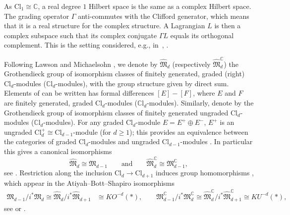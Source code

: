 \documentclass[pdftex]{sigma}
\numberwithin{equation}{section}
\newcommand{\C}{\mathbb{C}}
\newcommand{\Cl}{\mathrm{Cl}}
\newcommand{\CCl}{\mathbb{C}\mathrm{l}}
\begin{document}
\begin{Example}
As $\Cl_1 \cong \C$, a real degree $1$ Hilbert space is the same as a complex Hilbert space.
The grading operator $\Gamma$ anti-commutes with the Clifford generator, which means that it is a real structure for the complex structure.
A Lagrangian $L$ is then a complex subspace such that its complex conjugate $\Gamma L$ equals its orthogonal complement.
This is the setting considered, e.g., in~\cite[Section~2.2]{StolzTeichnerElliptic}, \cite{LudewigRoos}.
\end{Example}

Following Lawson and Michaelsohn \cite{LawsonMichelsohn}, we denote by $\hat{\mathfrak{M}}_d$ (respectively $\hat{\mathfrak{M}}_d^\C$) the Grothendieck group of isomorphism classes of finitely generated, graded (right) $\Cl_d$-modules ($\CCl_d$-modules), with the group structure given by direct sum.
Elements of \smash{$\hat{\mathfrak{M}}_d^{(\C)}$} can be written has formal differences $[E] - [F]$, where $E$ and $F$ are finitely generated, graded $\Cl_d$-modules ($\CCl_d$-modules).
Similarly, denote by \smash{$\mathfrak{M}_d^{(\C)}$} the Grothendieck group of isomorphism classes of finitely generated ungraded $\Cl_d$-modules ($\CCl_d$-modules).
For any graded $\Cl_d$-module $E = E^+ \oplus E^-$, $E^+$ is an ungraded $\Cl_d^+ \cong \Cl_{d-1}$-module (for $d \geq 1$); this provides an equivalence between the categories of graded $\Cl_d$-modules and ungraded $\Cl_{d-1}$-modules \cite[Proposition~5.20]{LawsonMichelsohn}.
In particular this gives a canonical isomorphisms
\begin{equation*} %
 \hat{\mathfrak{M}}_d \cong \mathfrak{M}_{d-1}\qquad \text{and} \qquad \hat{\mathfrak{M}}^\C_d \cong \mathfrak{M}^\C_{d-1},
\end{equation*}
see \cite[Proposition~5.1]{AtiyahBottShapiro}.
Restriction along the inclusion $\Cl_d \to \Cl_{d+1}$ induces group homo\-morphisms \smash{$i^*\colon \mathfrak{M}_{d+1}^{(\C)} \to \mathfrak{M}_d^{(\C)}$}, which appear in the Atiyah--Bott--Shapiro isomorphisms
\begin{align*}
 \mathfrak{M}_{d-1} / i^* \mathfrak{M}_d \cong \hat{\mathfrak{M}}_d / i^* \hat{\mathfrak{M}}_{d+1} &\cong KO^{-d}(*), \qquad
 \mathfrak{M}^\C_{d-1} / i^* \mathfrak{M}^\C_d \cong \hat{\mathfrak{M}}^\C_d / i^* \hat{\mathfrak{M}}^\C_{d+1} \cong KU^{-d}(*),%
 \end{align*}
see \cite{AtiyahBottShapiro} or \cite[Theorem~I.9.27]{LawsonMichelsohn}.
\end{document}
